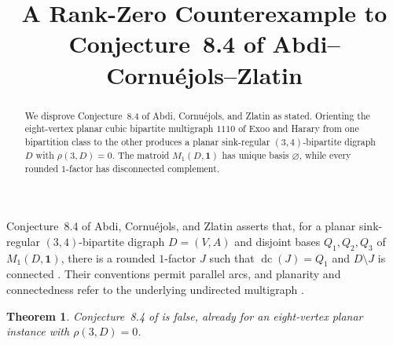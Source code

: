 \documentclass[11pt]{amsart}
\title[A rank-zero counterexample]
{A Rank-Zero Counterexample to Conjecture~8.4 of
Abdi--Cornu\'ejols--Zlatin}
\date{}
\newtheorem{theorem}{Theorem}
\theoremstyle{remark}
\newcommand{\dc}{\operatorname{dc}}
\begin{document}
\begin{abstract}
We disprove Conjecture~8.4 of Abdi, Cornu\'ejols, and Zlatin as
stated. Orienting the eight-vertex planar cubic bipartite multigraph
$1110$ of Exoo and Harary from one bipartition class to the other
produces a planar sink-regular $(3,4)$-bipartite digraph $D$ with
$\rho(3,D)=0$. The matroid $M_1(D,\mathbf{1})$ has unique basis
$\varnothing$, while every rounded $1$-factor has disconnected
complement.
\end{abstract}

\maketitle

Conjecture~8.4 of Abdi, Cornu\'ejols, and Zlatin asserts that, for a
planar sink-regular $(3,4)$-bipartite digraph $D=(V,A)$ and disjoint
bases $Q_1,Q_2,Q_3$ of $M_1(D,\mathbf{1})$, there is a rounded
$1$-factor $J$ such that $\dc(J)=Q_1$ and $D\setminus J$ is connected
\cite[Conjecture~8.4]{ACZ}. Their conventions permit parallel arcs,
and planarity and connectedness refer to the underlying undirected
multigraph \cite[pp.~2418, 2427]{ACZ}.

\begin{theorem}
Conjecture~8.4 of \cite{ACZ} is false, already for an eight-vertex
planar instance with $\rho(3,D)=0$.
\end{theorem}
\end{document}
